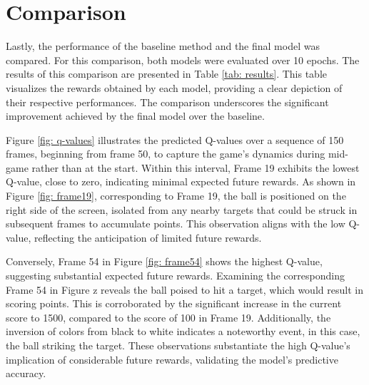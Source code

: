 \section{Comparison}
Lastly, the performance of the baseline method and the final model was compared. For this comparison, both models were evaluated over 10 epochs. The results of this comparison are presented in Table \ref{tab: results}. This table visualizes the rewards obtained by each model, providing a clear depiction of their respective performances. The comparison underscores the significant improvement achieved by the final model over the baseline.


Figure \ref{fig: q-values} illustrates the predicted Q-values over a sequence of 150 frames, beginning from frame 50, to capture the game's dynamics during mid-game rather than at the start. Within this interval, Frame 19 exhibits the lowest Q-value, close to zero, indicating minimal expected future rewards. As shown in Figure \ref{fig: frame19}, corresponding to Frame 19, the ball is positioned on the right side of the screen, isolated from any nearby targets that could be struck in subsequent frames to accumulate points. This observation aligns with the low Q-value, reflecting the anticipation of limited future rewards.

Conversely, Frame 54 in Figure \ref{fig: frame54} shows the highest Q-value, suggesting substantial expected future rewards. Examining the corresponding Frame 54 in Figure z reveals the ball poised to hit a target, which would result in scoring points. This is corroborated by the significant increase in the current score to 1500, compared to the score of 100 in Frame 19. Additionally, the inversion of colors from black to white indicates a noteworthy event, in this case, the ball striking the target. These observations substantiate the high Q-value's implication of considerable future rewards, validating the model's predictive accuracy.

